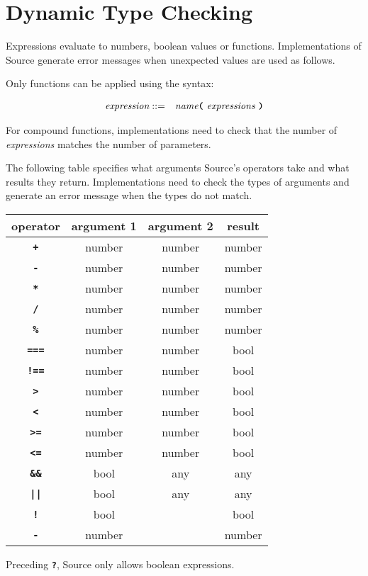 
\section{Dynamic Type Checking}

Expressions evaluate to numbers, boolean values or functions. Implementations
of Source generate error messages when unexpected values are used as follows.

Only functions can be applied using the syntax:

\begin{eqnarray*}
 \textit{expression}    
                                   & ::=   &  \textit{name}
                                               \texttt{\textbf{(}}\  \textit{expressions} \
                                               \texttt{\textbf{)}}\\ 
\end{eqnarray*}

For compound functions, implementations need to check that the number of \textit{expressions}
matches the number of parameters.

The following table specifies what arguments Source's operators
take and what results they return. Implementations need to check the types of arguments and
generate an error message when the types do not match.

\begin{center}
\begin{tabular}{c|c|c|c}
operator & argument 1 & argument 2 & result\\ \hline
\texttt{\textbf{+}} & number   & number     & number\\
\texttt{\textbf{-}} & number   & number     & number\\
\texttt{\textbf{*}} & number   & number     & number\\
\texttt{\textbf{/}} & number   & number     & number\\
\texttt{\textbf{\%}} & number   & number     & number\\
\texttt{\textbf{===}} & number   & number     & bool\\
\texttt{\textbf{!==}} & number   & number     & bool\\
\texttt{\textbf{>}} & number   & number     & bool\\
\texttt{\textbf{<}} & number   & number     & bool\\
\texttt{\textbf{>=}} & number   & number     & bool\\
\texttt{\textbf{<=}}    & number   & number     & bool\\
\texttt{\textbf{\&\&}} & bool & any & any\\
\texttt{\textbf{||}}   & bool & any & any\\
\texttt{\textbf{!}}    & bool &      & bool\\
\texttt{\textbf{-}}    & number &    & number
\end{tabular}
\end{center}

Preceding \texttt{\textbf{?}}, Source only allows
boolean expressions.
